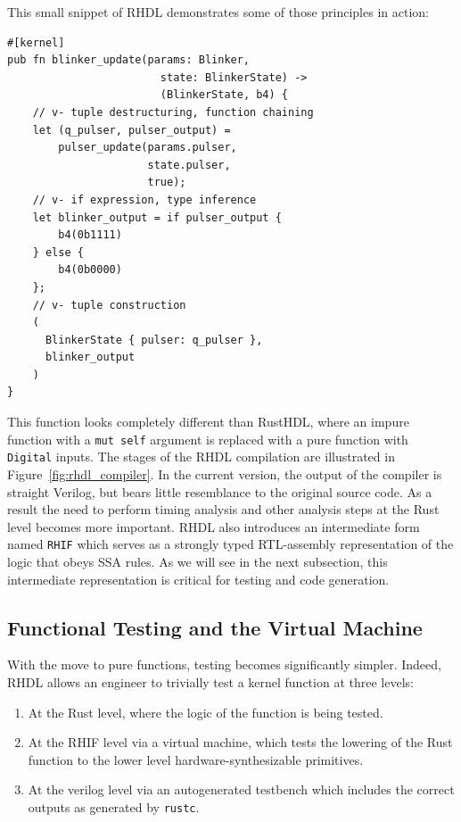 \documentclass[conference]{IEEEtran}
\begin{document}
This small snippet of RHDL demonstrates some of those principles in action:
\begin{verbatim}
#[kernel]
pub fn blinker_update(params: Blinker, 
                        state: BlinkerState) -> 
                        (BlinkerState, b4) {
    // v- tuple destructuring, function chaining
    let (q_pulser, pulser_output) = 
        pulser_update(params.pulser, 
                      state.pulser, 
                      true);
    // v- if expression, type inference
    let blinker_output = if pulser_output {
        b4(0b1111)
    } else {
        b4(0b0000)
    };
    // v- tuple construction
    (
      BlinkerState { pulser: q_pulser }, 
      blinker_output
    )
}
\end{verbatim}
This function looks completely different than RustHDL, where an impure function with a \verb|mut self| argument
is replaced with a pure function with \verb|Digital| inputs.  The stages of the RHDL compilation are illustrated in 
Figure~\ref{fig:rhdl_compiler}.  In the current version, the output of the compiler is straight Verilog, but bears
little resemblance to the original source code.  As a result the need to perform timing analysis and other analysis
steps at the Rust level becomes more important.  RHDL also introduces an intermediate form named \verb|RHIF| which 
serves as a strongly typed RTL-assembly representation of the logic that obeys SSA rules.  As we will see in the
next subsection, this intermediate representation is critical for testing and code generation.

\subsection{Functional Testing and the Virtual Machine}
With the move to pure functions, testing becomes significantly simpler.  Indeed, RHDL allows an engineer to 
trivially test a kernel function at three levels:

\begin{enumerate}
  \item At the Rust level, where the logic of the function is being tested.
  \item At the RHIF level via a virtual machine, which tests the lowering of the Rust function to the lower 
  level hardware-synthesizable primitives.
  \item At the verilog level via an autogenerated testbench which includes the correct outputs as generated 
  by \verb|rustc|.
\end{enumerate}
\end{document}
